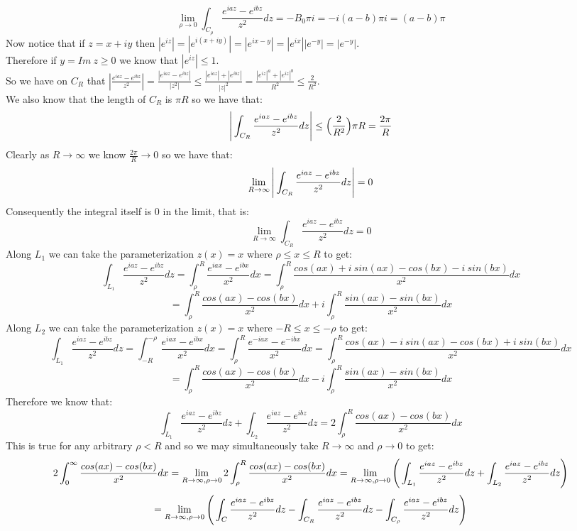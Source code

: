 \documentclass{article}
\begin{document}
\begin{center}
    \[\lim _{\rho\rightarrow 0}\int _{C_{\rho}}\frac{e^{iaz} - e^{ibz}}{z^2} dz = -B_0 \pi i = -i(a - b)\pi i = (a - b)\pi\]
    Now notice that if $z = x + iy$ then $|e^{iz}| = |e^{i(x + iy)}| = |e^{ix - y}| = |e^{ix}||e^{-y}| = |e^{-y}|$.
    \\Therefore if $y = Im\:z\geq 0$ we know that $|e^{iz}|\leq 1$.
    \\So we have on $C_R$ that $|\frac{e^{iaz} - e^{ibz}}{z^2}| =\frac{|e^{iaz} - e^{ibz}|}{|z^2|}\leq\frac{|e^{iaz}| + |e^{ibz}|}{|z|^2} =\frac{|e^{iz}|^a + |e^{iz}|^b}{R^2}\leq\frac{2}{R^2}$.
    \\We also know that the length of $C_R$ is $\pi R$ so we have that:
    \[\Bigg{|}\int _{C_R}\frac{e^{iaz} - e^{ibz}}{z^2} dz\Bigg{|}\leq\Big{(}\frac{2}{R^2}\Big{)}\pi R =\frac{2\pi}{R}\]
    Clearly as $R\rightarrow\infty$ we know $\frac{2\pi}{R}\rightarrow 0$ so we have that:
    \[\lim _{R\rightarrow\infty}\Bigg{|}\int _{C_R}\frac{e^{iaz} - e^{ibz}}{z^2} dz\Bigg{|} = 0\]
    Consequently the integral itself is 0 in the limit, that is:
    \[\lim _{R\rightarrow\infty}\int _{C_R}\frac{e^{iaz} - e^{ibz}}{z^2} dz = 0\]
    Along $L_1$ we can take the parameterization $z(x) = x$ where $\rho\leq x\leq R$ to get:
    \[\int _{L_1}\frac{e^{iaz} - e^{ibz}}{z^2} dz =\int _{\rho}^R\frac{e^{iax} - e^{ibx}}{x^2} dx =\int _{\rho}^R\frac{cos(ax) + i\:sin(ax) - cos(bx) - i\:sin(bx)}{x^2} dx\]
    \[=\int _{\rho}^R\frac{cos(ax) - cos(bx)}{x^2} dx + i\int _{\rho}^R\frac{sin(ax) - sin(bx)}{x^2} dx\]
    Along $L_2$ we can take the parameterization $z(x) = x$ where $-R\leq x\leq -\rho$ to get:
    \[\int _{L_1}\frac{e^{iaz} - e^{ibz}}{z^2} dz =\int _{-R}^{-\rho}\frac{e^{iax} - e^{ibx}}{x^2} dx =\int _{\rho}^R\frac{e^{-iax} - e^{-ibx}}{x^2} dx =\int _{\rho}^R\frac{cos(ax) - i\:sin(ax) - cos(bx) + i\:sin(bx)}{x^2} dx\]
    \[=\int _{\rho}^R\frac{cos(ax) - cos(bx)}{x^2} dx - i\int _{\rho}^R\frac{sin(ax) - sin(bx)}{x^2} dx\]
    Therefore we know that:
    \[\int _{L_1}\frac{e^{iaz} - e^{ibz}}{z^2} dz +\int _{L_2}\frac{e^{iaz} - e^{ibz}}{z^2} dz = 2\int _{\rho}^R\frac{cos(ax) - cos(bx)}{x^2} dx\]
    This is true for any arbitrary $\rho < R$ and so we may simultaneously take $R\rightarrow\infty$ and $\rho\rightarrow 0$ to get:
    \[2\int _0^{\infty}\frac{cos(ax) - cos(bx)}{x^2} dx =\lim _{R\rightarrow\infty,\rho\rightarrow 0} 2\int _{\rho}^R\frac{cos(ax) - cos(bx)}{x^2} dx =\lim _{R\rightarrow\infty,\rho\rightarrow 0}\Bigg{(}\int _{L_1}\frac{e^{iaz} - e^{ibz}}{z^2} dz +\int _{L_2}\frac{e^{iaz} - e^{ibz}}{z^2} dz\Bigg{)}\]
    \[=\lim _{R\rightarrow\infty,\rho\rightarrow 0}\Bigg{(}\int _{C}\frac{e^{iaz} - e^{ibz}}{z^2} dz -\int _{C_R}\frac{e^{iaz} - e^{ibz}}{z^2} dz -\int _{C_{\rho}}\frac{e^{iaz} - e^{ibz}}{z^2} dz\Bigg{)}\]

\end{center}
\end{document}

